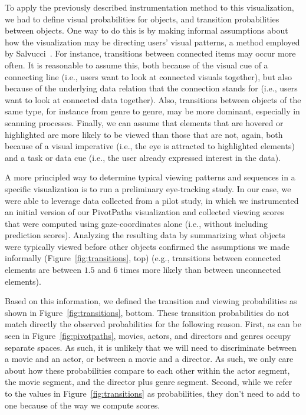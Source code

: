 To apply the previously described instrumentation method to this visualization, we had to define visual probabilities for objects, and transition probabilities between objects. One way to do this is by making informal assumptions about how the visualization may be directing users' visual patterns, a method employed by Salvucci~\cite{salvucci2000intelligent}. For instance, transitions between connected items may occur more often. It is reasonable to assume this, both because of the visual cue of a connecting line (i.e., users want to look at connected visuals together), but also because of the underlying data relation that the connection stands for (i.e., users want to look at connected data together). Also, transitions between objects of the same type, for instance from genre to genre, may be more dominant, especially in scanning processes. Finally, we can assume that elements that are hovered or highlighted are more likely to be viewed than those that are not, again, both because of a visual imperative (i.e., the eye is attracted to highlighted elements) and a task or data cue (i.e., the user already expressed interest in the data).

A more principled way to determine typical viewing patterns and sequences in a specific visualization is to run a preliminary eye-tracking study. In our case, we were able to leverage data collected from a pilot study, in which we instrumented an initial version of our PivotPaths visualization and collected viewing scores that were computed using gaze-coordinates alone (i.e., without including prediction scores). Analyzing the resulting data by summarizing what objects were typically viewed before other objects confirmed the assumptions we made informally (Figure~\ref{fig:transitions}, top) (e.g., transitions between connected elements are between $1.5$ and $6$ times more likely than between unconnected elements). 

Based on this information, we defined the transition and viewing probabilities as shown in Figure~\ref{fig:transitions}, bottom. These transition probabilities do not match directly the observed probabilities for the following reason. First, as can be seen in Figure~\ref{fig:pivotpaths}, movies, actors, and directors and genres occupy separate spaces. As such, it is unlikely that we will need to discriminate between a movie and an actor, or between a movie and a director. As such, we only care about how these probabilities compare to each other within the actor segment, the movie segment, and the director plus genre segment. Second, while we refer to the values in Figure~\ref{fig:transitions} as probabilities, they don't need to add to one because of the way we compute scores. 

